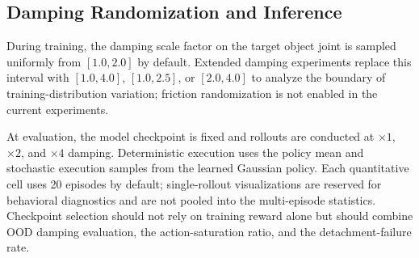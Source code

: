 \documentclass{llmxive}
\begin{document}
\subsection{Damping Randomization and Inference}
\label{app:dyn}

During training, the damping scale factor on the target object joint
is sampled uniformly from $[1.0, 2.0]$ by default. Extended damping
experiments replace this interval with $[1.0, 4.0]$, $[1.0, 2.5]$,
or $[2.0, 4.0]$ to analyze the boundary of training-distribution
variation; friction randomization is not enabled in the current
experiments.

At evaluation, the model checkpoint is fixed and rollouts are
conducted at $\times1$, $\times2$, and $\times4$ damping. Deterministic execution
uses the policy mean and stochastic execution samples from the
learned Gaussian policy. Each quantitative cell uses 20 episodes by
default; single-rollout visualizations are reserved for behavioral
diagnostics and are not pooled into the multi-episode statistics.
Checkpoint selection should not rely on training reward alone but
should combine OOD damping evaluation, the action-saturation ratio,
and the detachment-failure rate.
\end{document}
